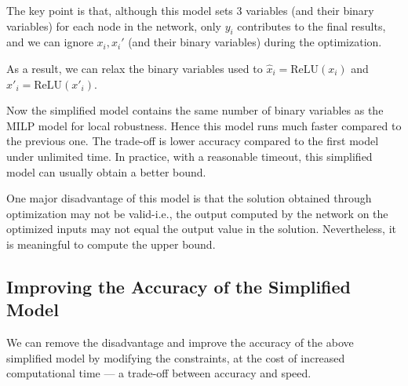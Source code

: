 \documentclass[letterpaper]{article} %
\newcommand{\ReLU}{\mathrm{ReLU}}
\begin{document}
	The key point is that, although this model sets 3 variables (and their binary variables) for each node in the network, only $y_i$  contributes to the final results, and we can ignore $x_i,x_i'$ (and their binary variables) during the optimization.
	
	As a result, we can relax the binary variables used to $\hat{x}_i = \ReLU(x_i)$ and $\hat{x}'_i = \ReLU(x'_i)$.
	
	Now the simplified model contains the same number of binary variables as the MILP model for local robustness. Hence this model runs much faster compared to the previous one. The trade-off is lower accuracy compared to the first model under unlimited time. In practice, with a reasonable timeout, this simplified model can usually obtain a better bound.
	
	One major disadvantage of this model is that the solution obtained through optimization may not be valid-i.e., the output computed by the network on the optimized inputs may not equal the output value in the solution. Nevertheless, it is meaningful to compute the upper bound. 
	
	\subsection{Improving the Accuracy of the Simplified Model}
	We can remove the disadvantage and improve the accuracy of the above simplified model by modifying the constraints, at the cost of increased computational time — a trade-off between accuracy and speed. 
	
	
	
	
	
\end{document}
